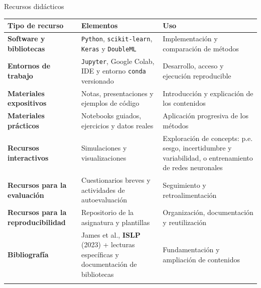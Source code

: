 \documentclass[
  8pt,
  ignorenonframetext,
  aspectratio=169,
  spanish,
]{beamer}
\newcommand{\lightrowrule}{\arrayrulecolor{black!25}\specialrule{0.4pt}{1pt}{1pt}\arrayrulecolor{black}}
\begin{document}
\begin{frame}[fragile]{Recursos didácticos}
\label{recursos-diduxe1cticos}
~

\begin{longtable}[]{@{}
  >{\raggedright\arraybackslash}p{}
  >{\raggedright\arraybackslash}p{}
  >{\raggedright\arraybackslash}p{}@{}}
\toprule\noalign{}
\begin{minipage}[b]{\linewidth}\raggedright
Tipo de recurso
\end{minipage} & \begin{minipage}[b]{\linewidth}\raggedright
Elementos
\end{minipage} & \begin{minipage}[b]{\linewidth}\raggedright
Uso
\end{minipage} \\
\midrule\noalign{}
\endhead
\bottomrule\noalign{}
\endlastfoot
\textbf{Software y bibliotecas} & \texttt{Python},
\texttt{scikit-learn}, \texttt{Keras} y \texttt{DoubleML} &
Implementación y comparación de métodos \\ \lightrowrule
\textbf{Entornos de trabajo} & \texttt{Jupyter}, Google Colab, IDE y
entorno \texttt{conda} versionado & Desarrollo, acceso y ejecución
reproducible \\ \lightrowrule
\textbf{Materiales expositivos} & Notas, presentaciones y ejemplos de
código & Introducción y explicación de los contenidos \\ \lightrowrule
\textbf{Materiales prácticos} & Notebooks guiados, ejercicios y datos
reales & Aplicación progresiva de los métodos \\ \lightrowrule
\textbf{Recursos interactivos} & Simulaciones y visualizaciones &
Exploración de concepts: p.e. sesgo, incertidumbre y variabilidad, o
entrenamiento de redes neuronales \\ \lightrowrule
\textbf{Recursos para la evaluación} & Cuestionarios breves y
actividades de autoevaluación & Seguimiento y retroalimentación \\ \lightrowrule
\textbf{Recursos para la reproducibilidad} & Repositorio de la
asignatura y plantillas & Organización, documentación y reutilización \\ \lightrowrule
\textbf{Bibliografía} & James et al., \textbf{ISLP} (2023) + lecturas
específicas y documentación de bibliotecas & Fundamentación y ampliación
de contenidos \\ \lightrowrule
\end{longtable}


\end{frame}
\end{document}

